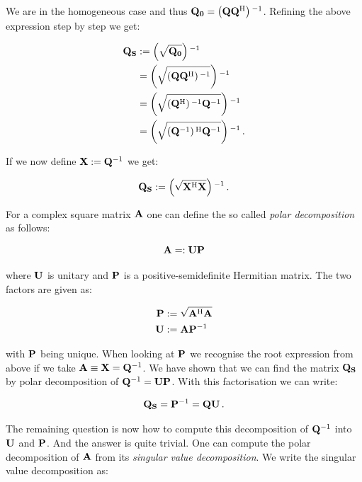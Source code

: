 We are in the homogeneous case and thus $\mathbf{Q_0} = \left( \mathbf{Q} \mathbf{Q}{}^{\textnormal{H}} \right){}^{-1}$.
Refining the above expression step by step we get:

\begin{align*}
  \mathbf{Q_S} & := \left( \sqrt{\mathbf{Q_0}} \right){}^{-1} \\
            & = \left( \sqrt{\left( \mathbf{Q} \mathbf{Q}{}^{\textnormal{H}} \right){}^{-1}} \right){}^{-1} \\
            & = \left( \sqrt{\left( \mathbf{Q}{}^{\textnormal{H}} \right){}^{-1} \mathbf{Q}{}^{-1}} \right){}^{-1} \\
            & = \left( \sqrt{\left( \mathbf{Q}{}^{-1} \right){}^{\textnormal{H}} \mathbf{Q}{}^{-1}} \right){}^{-1} \,.
\end{align*}

If we now define $\mathbf{X} := \mathbf{Q}{}^{-1}$ we get:

\begin{equation}
  \mathbf{Q_S} := \left( \sqrt{\mathbf{X}{}^{\textnormal{H}} \mathbf{X}} \right){}^{-1} \,.
\end{equation}

For a complex square matrix $\mathbf{A}$ one can define the so called \emph{polar decomposition}
as follows:

\begin{equation*}
  \mathbf{A} =: \mathbf{U} \mathbf{P}
\end{equation*}

where $\mathbf{U}$ is unitary and $\mathbf{P}$ is a positive-semidefinite Hermitian matrix.
The two factors are given as:

\begin{align*}
  \mathbf{P} & := \sqrt{\mathbf{A}{}^{\textnormal{H}} \mathbf{A}} \\
  \mathbf{U} & := \mathbf{A} \mathbf{P}{}^{-1}
\end{align*}

with $\mathbf{P}$ being unique. When looking at $\mathbf{P}$ we recognise the root
expression from above if we take $\mathbf{A} \equiv \mathbf{X} = \mathbf{Q}{}^{-1}$. We have
shown that we can find the matrix $\mathbf{Q_S}$ by polar decomposition of $\mathbf{Q}{}^{-1} = \mathbf{U} \mathbf{P}$.
With this factorisation we can write:

\begin{equation*}
  \mathbf{Q_S} = \mathbf{P}{}^{-1} = \mathbf{Q} \mathbf{U} \,.
\end{equation*}

The remaining question is now how to compute this decomposition of $\mathbf{Q}{}^{-1}$
into $\mathbf{U}$ and $\mathbf{P}$. And the answer is quite trivial. One can compute
the polar decomposition of $\mathbf{A}$ from its \emph{singular value decomposition}.
We write the singular value decomposition as:

